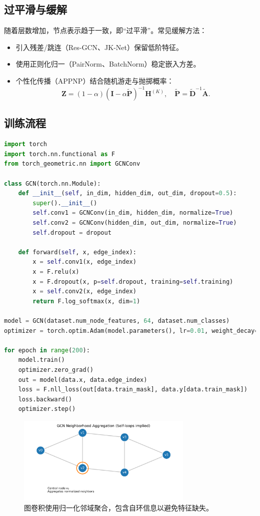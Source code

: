 \documentclass[UTF8,zihao=-4]{ctexart}
\begin{document}
\subsection{过平滑与缓解}
随着层数增加，节点表示趋于一致，即“过平滑”。常见缓解方法：
\begin{itemize}
  \item 引入残差/跳连（Res-GCN、JK-Net）保留低阶特征。
  \item 使用正则化归一（PairNorm、BatchNorm）稳定嵌入方差。
  \item 个性化传播（APPNP）结合随机游走与抛掷概率：
  \begin{equation}
    \mathbf{Z} = (1-\alpha) (\mathbf{I} - \alpha \tilde{\mathbf{P}})^{-1} \mathbf{H}^{(K)}, \quad \tilde{\mathbf{P}} = \tilde{\mathbf{D}}^{-1} \tilde{\mathbf{A}}.
  \end{equation}
\end{itemize}

\subsection{训练流程}
\begin{lstlisting}[language=Python, caption={基于 PyTorch Geometric 的半监督二维 GCN 节点分类示例。}]
import torch
import torch.nn.functional as F
from torch_geometric.nn import GCNConv

class GCN(torch.nn.Module):
    def __init__(self, in_dim, hidden_dim, out_dim, dropout=0.5):
        super().__init__()
        self.conv1 = GCNConv(in_dim, hidden_dim, normalize=True)
        self.conv2 = GCNConv(hidden_dim, out_dim, normalize=True)
        self.dropout = dropout

    def forward(self, x, edge_index):
        x = self.conv1(x, edge_index)
        x = F.relu(x)
        x = F.dropout(x, p=self.dropout, training=self.training)
        x = self.conv2(x, edge_index)
        return F.log_softmax(x, dim=1)

model = GCN(dataset.num_node_features, 64, dataset.num_classes)
optimizer = torch.optim.Adam(model.parameters(), lr=0.01, weight_decay=5e-4)

for epoch in range(200):
    model.train()
    optimizer.zero_grad()
    out = model(data.x, data.edge_index)
    loss = F.nll_loss(out[data.train_mask], data.y[data.train_mask])
    loss.backward()
    optimizer.step()
\end{lstlisting}

\begin{figure}[H]
  \centering
  \includegraphics[width=0.75\textwidth]{gcn_graph_structure.png}
  \caption{图卷积使用归一化邻域聚合，包含自环信息以避免特征缺失。}
  \label{fig:gcn_graph_structure_cn}
\end{figure}
\end{document}
